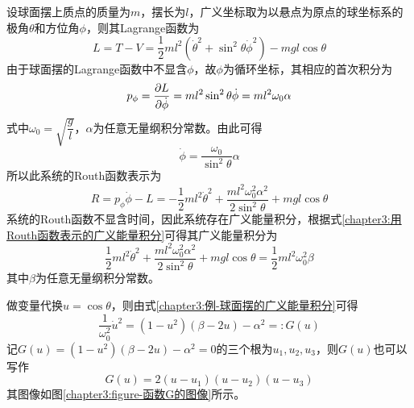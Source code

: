 \begin{example}[球面摆的运动]
设球面摆上质点的质量为$m$，摆长为$l$，广义坐标取为以悬点为原点的球坐标系的极角$\theta$和方位角$\phi$，则其Lagrange函数为
\begin{equation}
	L = T-V = \frac12 ml^2(\dot{\theta}^2+\sin^2\theta\dot{\phi}^2) - mgl\cos\theta
	\label{chapter3:例-球面摆的Lagrange函数}
\end{equation}
由于球面摆的Lagrange函数中不显含$\phi$，故$\phi$为循环坐标，其相应的首次积分为
\begin{equation}
	p_\phi = \frac{\partial L}{\partial \dot{\phi}} = ml^2 \sin^2\theta\dot{\phi} = ml^2\omega_0\alpha
\end{equation}
式中$\omega_0 = \sqrt{\dfrac gl}$，$\alpha$为任意无量纲积分常数。由此可得
\begin{equation}
	\dot{\phi} = \frac{\omega_0}{\sin^2\theta}\alpha
	\label{chapter3:例-球面摆的方位角导数}
\end{equation}
所以此系统的Routh函数表示为
\begin{equation}
	R = p_\phi\dot{\phi} - L = -\frac12 ml^2 \dot{\theta}^2 + \frac{ml^2\omega_0^2\alpha^2}{2\sin^2 \theta}+mgl\cos \theta
	\label{chapter3:例-球面摆的Routh函数}
\end{equation}
系统的Routh函数不显含时间，因此系统存在广义能量积分，根据式\eqref{chapter3:用Routh函数表示的广义能量积分}可得其广义能量积分为
\begin{equation}
	\frac12 ml^2 \dot{\theta}^2 + \frac{ml^2\omega_0^2\alpha^2}{2\sin^2 \theta}+mgl\cos \theta = \frac12 ml^2\omega_0^2\beta
	\label{chapter3:例-球面摆的广义能量积分}
\end{equation}
其中$\beta$为任意无量纲积分常数。

做变量代换$u=\cos\theta$，则由式\eqref{chapter3:例-球面摆的广义能量积分}可得
\begin{equation}
	\frac{1}{\omega_0^2}\dot{u}^2 = (1-u^2)(\beta-2u)-\alpha^2 =: G(u)
	\label{chapter3:球面摆的G函数}
\end{equation}
记$G(u)=(1-u^2)(\beta-2u)-\alpha^2=0$的三个根为$u_1,u_2,u_3$，则$G(u)$也可以写作
\begin{equation}
	G(u) = 2(u-u_1)(u-u_2)(u-u_3)
	\label{chapter3:球面摆的G函数-以根来表示}
\end{equation}
其图像如图\ref{chapter3:figure-函数G的图像}所示。


\end{example}
